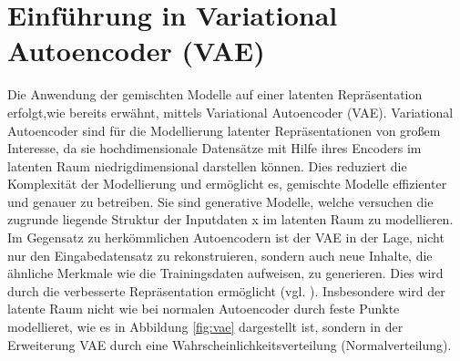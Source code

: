 \documentclass[%
thesis=student,%
coverpage=false,%
titlepage=false,%
headmarks=true, %
german,%
font=libertine, %
math=newpxtx, %
BCOR=5mm,%
coverBCOR=11mm%
]{tumbook}
\theoremstyle{break}
\begin{document}


\section{Einführung in Variational Autoencoder (VAE)}
Die Anwendung der gemischten Modelle auf einer latenten Repräsentation erfolgt,wie bereits erwähnt, mittels Variational Autoencoder (VAE).
Variational Autoencoder sind für die Modellierung latenter Repräsentationen von großem Interesse, da sie hochdimensionale Datensätze mit Hilfe ihres Encoders im latenten Raum niedrigdimensional darstellen können. Dies reduziert die Komplexität der Modellierung und ermöglicht es, gemischte Modelle effizienter und genauer zu betreiben. Sie sind generative Modelle, welche versuchen die zugrunde liegende Struktur der Inputdaten x im latenten Raum zu modellieren. Im Gegensatz zu herkömmlichen Autoencodern ist der VAE in der Lage, nicht nur den Eingabedatensatz zu rekonstruieren, sondern auch neue Inhalte, die ähnliche Merkmale wie die Trainingsdaten aufweisen, zu generieren. Dies wird durch die verbesserte Repräsentation ermöglicht (vgl. \cite{bigdata-insider-vae}). Insbesondere wird der latente Raum nicht wie bei normalen Autoencoder durch feste Punkte modellieret, wie es in Abbildung \ref{fig:vae} dargestellt ist, sondern in der Erweiterung VAE durch eine Wahrscheinlichkeitsverteilung (Normalverteilung).
\end{document}
